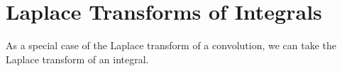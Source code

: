 \documentclass[12pt,a4paper]{article}
\newcounter{example}[section]
\begin{document}
	\begin{comment}
	\section{Applications to ODE}
	
	\begin{example}
	Find the solution $y(t)$ to the following IVP:
		\begin{align*}
		y'' + 3y' + y = f(t) , \quad y(0) = 0,\, y' (0) = 0 .
		\end{align*}
	\end{example}
	
	\newpage
	
	\phantom{2}
	
	\vfill
	
	\underline{General Convolution Formula:}
	The solution $y(t)$ to the following IVP
		\begin{align*}
		ay'' + by' + cy = f(t) , \quad y(0) = k_0 , \, y'(0)= k_1
		\end{align*}
	is
		\begin{align*}
		y (t) = k_0 y_1 (t) + k_1 y_2 (t) + (w \ast f) (t)
		\end{align*}
	where
		\begin{itemize}
		\item $y_1$ is a solution to the following IVP
			\begin{align*}
			ay_1'' + by_1'' + cy_1 = 0, \quad y_1 (0) = 1, \, y_1'(0) = 0 ;
			\end{align*}
		\item $y_2$ is a solution to the following IVP
			\begin{align*}
			ay_2'' + by_2'' + cy_2 = 0 , \quad y_2 (0) = 0 , \, y_2' (0) = 1 ;
			\end{align*}
		\item $w(t)$ satisfies
			\begin{align*}
			w(t) = \frac{1}{a} y_2 (t) .
			\end{align*}
		\end{itemize}
		
	\newpage
	\end{comment}
	
	\section{Laplace Transforms of Integrals}
	As a special case of the Laplace transform of a convolution, we can take the Laplace transform of an integral.
	
\end{document}
